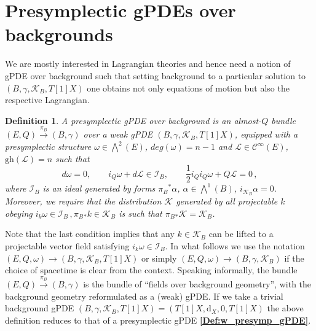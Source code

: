 \documentclass[a4paper,12pt]{article}
\numberwithin{equation}{section} %
\newtheorem{definition}[thm]{Definition}
\newcommand{\bref}[1]{\textbf{\ref{#1}}}
\newcommand{\gh}[1]{\mathrm{gh}(#1)}
\newcommand{\dx}{\mathrm{d}_X}
\newcommand{\cC}{\mathcal{C}}
\def\cI{\mathcal{I}}
\def\cK{\mathcal{K}}
\def\cL{\mathcal{L}}
\begin{document}
 
\section{Presymplectic gPDEs over backgrounds} \label{sec:presymp-bgpde}

We are mostly interested in Lagrangian theories and hence need a notion of gPDE over background such that setting background to a particular solution to $(B,\gamma,\cK_B,T[1]X)$ one obtains not only equations of motion but also the respective Lagrangian.

\begin{definition} \label{def:B-presymp}
A presymplectic gPDE over background is an almost-$Q$ bundle  $(E,Q) \xrightarrow{{\pi_B}} (B, \gamma)$ over a 
weak gPDE $(B,\gamma, \cK_B,T[1]X)$, equipped with a presymplectic structure $\omega \in \bigwedge^2(E)$, $deg(\omega) = n-1$ and $\cL \in \cC^{\infty}(E)$, $\gh{\cL}=n$ such that
    \begin{equation}\label{compat2_theory}
        d\omega = 0, \qquad i_Q\omega + d\cL \in {\cI_B}, \qquad \frac{1}{2}i_Q i_Q \omega + Q\cL = 0\,,
    \end{equation}
    where $\cI_B$ is an ideal generated by forms ${\pi_B}^*\alpha$, $ \alpha \in \bigwedge^{1}(B)$, $i_{\cK_B} \alpha = 0$. Moreover, we require that the distribution $\cK$ generated by all projectable $k$ obeying $i_k \omega \in \cI_B\,, \pi_B{}_* k \in \cK_B $ is such that $\pi_B{}_* \cK = \cK_B$.
\end{definition}
Note that the last condition implies that any $k \in \cK_B$ can be lifted to a projectable vector field satisfying $i_k \omega \in \cI_B$.
In what follows we use the notation $(E,Q,\omega)\to (B,\gamma, \cK_B,T[1]X)$ or simply $(E,Q,\omega)\to (B,\gamma, \cK_B)$ if the choice of spacetime is clear from the context. Speaking informally, the bundle $(E,Q) \xrightarrow{{\pi_B}} (B,\gamma)$ is the bundle of ``fields over background geometry'', with the background geometry reformulated as a (weak) gPDE. If we take a trivial background gPDE $(B,\gamma,\cK_B,T[1]X)=(T[1]X,\dx,0,T[1]X)$ the above definition reduces to that of a presymplectic gPDE \bref{Def:w_presymp_gPDE}. 
\end{document}
